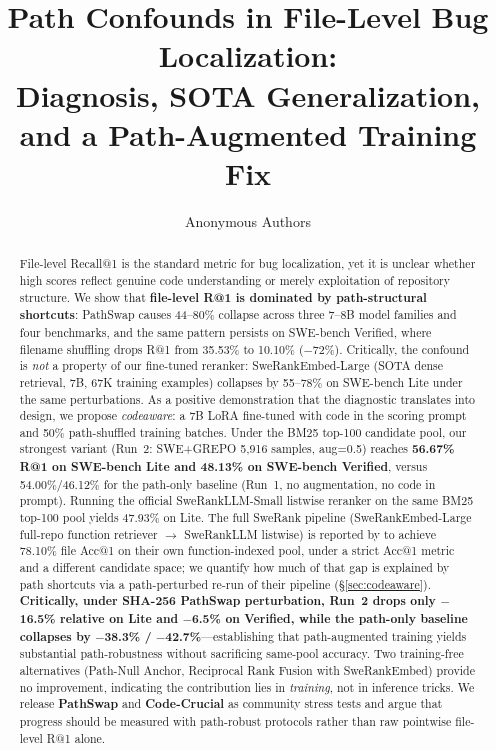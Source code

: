 \documentclass{article}
\title{Path Confounds in File-Level Bug Localization:\\Diagnosis, SOTA Generalization, and a Path-Augmented Training Fix}
\author{Anonymous Authors}
\begin{document}
\maketitle

\begin{abstract}
File-level Recall@1 is the standard metric for bug localization, yet it is unclear whether high scores reflect genuine code understanding or merely exploitation of repository structure.
We show that \textbf{file-level R@1 is dominated by path-structural shortcuts}: PathSwap causes 44--80\% collapse across three 7--8B model families and four benchmarks, and the same pattern persists on SWE-bench Verified, where filename shuffling drops R@1 from 35.53\% to 10.10\% ($-$72\%).
Critically, the confound is \emph{not} a property of our fine-tuned reranker: SweRankEmbed-Large (SOTA dense retrieval, 7B, 67K training examples) collapses by 55--78\% on SWE-bench Lite under the same perturbations.
As a positive demonstration that the diagnostic translates into design, we propose \emph{codeaware}: a 7B LoRA fine-tuned with code in the scoring prompt and 50\% path-shuffled training batches. Under the BM25 top-100 candidate pool, our strongest variant (Run~2: SWE+GREPO 5{,}916 samples, aug=0.5) reaches \textbf{56.67\% R@1 on SWE-bench Lite and 48.13\% on SWE-bench Verified}, versus 54.00\%/46.12\% for the path-only baseline (Run~1, no augmentation, no code in prompt). Running the official SweRankLLM-Small listwise reranker on the same BM25 top-100 pool yields 47.93\% on Lite. The full SweRank pipeline (SweRankEmbed-Large full-repo function retriever $\to$ SweRankLLM listwise) is reported by \citet{reddy2025swerank} to achieve 78.10\% file Acc@1 on their own function-indexed pool, under a strict Acc@1 metric and a different candidate space; we quantify how much of that gap is explained by path shortcuts via a path-perturbed re-run of their pipeline (\S\ref{sec:codeaware}). \textbf{Critically, under SHA-256 PathSwap perturbation, Run~2 drops only $-$16.5\% relative on Lite and $-$6.5\% on Verified, while the path-only baseline collapses by $-$38.3\% / $-$42.7\%}---establishing that path-augmented training yields substantial path-robustness without sacrificing same-pool accuracy.
Two training-free alternatives (Path-Null Anchor, Reciprocal Rank Fusion with SweRankEmbed) provide no improvement, indicating the contribution lies in \emph{training}, not in inference tricks.
We release \textbf{PathSwap} and \textbf{Code-Crucial} as community stress tests and argue that progress should be measured with path-robust protocols rather than raw pointwise file-level R@1 alone.
\end{abstract}
\end{document}
